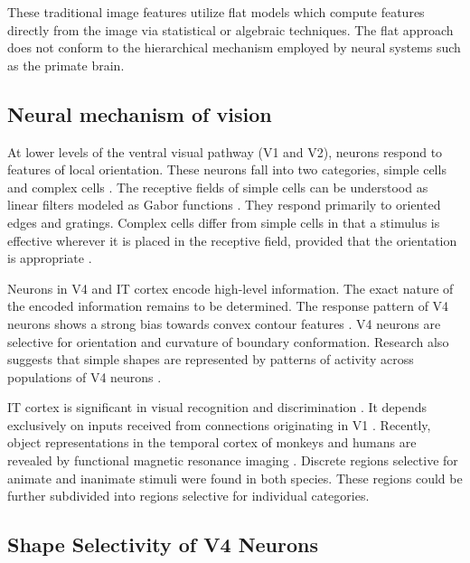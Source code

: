 \documentclass[5p]{elsarticle}
\begin{document}
These traditional image features utilize flat models which compute features directly from the image
via statistical or algebraic techniques. 
The flat approach does not conform to the hierarchical mechanism \cite{ungerleider2011} 
employed by neural systems such as the primate brain.

\subsection{Neural mechanism of vision}

At lower levels of the ventral visual pathway (V1 and V2), neurons respond to features of local orientation. 
These neurons fall into two categories, 
simple cells and complex cells \cite{hubel1962,hubel1965,martinez2003}.
The receptive fields of simple cells 
can be understood as linear filters modeled as Gabor functions \cite{gabor1946}. 
They respond primarily to oriented edges and gratings.
Complex cells differ from simple cells in that a stimulus is
effective wherever it is placed in the receptive field, provided
that the orientation is appropriate \cite{hubel1962,hubel1965}. 

Neurons in V4 and IT cortex encode high-level information.
The exact nature of the encoded information remains to be determined.
The response pattern of V4 neurons shows 
a strong bias towards convex contour features \cite{pasupathy1999,pasupathy2001,pasupathy2002}. 
V4 neurons are selective for orientation and curvature of boundary conformation.
Research also suggests that simple shapes are represented 
by patterns of activity across populations of V4 neurons \cite{pasupathy2002}.

IT cortex is significant in visual recognition and
discrimination \cite{desimone1980,bell2009,ungerleider2011,bruce1981}.
It depends exclusively on inputs received from
connections originating in V1 \cite{desimone1980}.
Recently, object representations in the temporal cortex of monkeys and humans are revealed 
by functional magnetic resonance imaging \cite{bell2009}.
Discrete regions selective for animate and inanimate stimuli were found in both species.
These regions could be further subdivided into regions selective for individual categories.

\subsection{Shape Selectivity of V4 Neurons}
\end{document}
